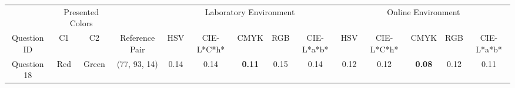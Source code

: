 \begin{table}[!htbp]
  \centering
  \resizebox{0.8\textwidth}{!} {
  \begin{tabular}{@{}cccccclccccclcccc@{}}
    \toprule
                                     & \multicolumn{2}{c}{Presented Colors}                        & \multicolumn{2}{c}{}                                                                                                  & \multicolumn{6}{c}{Laboratory Environment}                                                                                                                                                                                                                                                                     & \multicolumn{6}{c}{Online Environment}                                                                                                                                                                                                                                                                         \\ \cmidrule(lr){2-3} \cmidrule(l){6-17}
    \multirow{-2}{*}{Question ID}    & C1                           & C2                           & \multicolumn{2}{c}{\multirow{-2}{*}{Reference Pair}}                                                                  & \multicolumn{2}{c}{HSV}                                    & CIE-L*C*h*                                                 & CMYK                                                       & RGB                                                        & CIE-L*a*b*                                                 & \multicolumn{2}{c}{HSV}                                    & CIE-L*C*h*                                                 & CMYK                                                       & RGB                                                        & CIE-L*a*b*                                                 \\ \midrule
    \multicolumn{1}{c|}{Question 18} & \multicolumn{1}{c|}{Red}     & \multicolumn{1}{c|}{Green}   & \multicolumn{2}{c||}{\cellcolor[HTML]{FFFF00}(77, 93, 14)}                                                             & \multicolumn{2}{c|}{0.14}                                  & \multicolumn{1}{c|}{0.14}                                  & \multicolumn{1}{c|}{\cellcolor[HTML]{32CB00}\textbf{0.11}} & \multicolumn{1}{c|}{0.15}                                  & \multicolumn{1}{c||}{0.14}                                  & \multicolumn{2}{c|}{\cellcolor[HTML]{FFFFFF}0.12}          & \multicolumn{1}{c|}{\cellcolor[HTML]{FFFFFF}0.12}          & \multicolumn{1}{c|}{\cellcolor[HTML]{32CB00}\textbf{0.08}} & \multicolumn{1}{c|}{\cellcolor[HTML]{FFFFFF}0.12}          & \multicolumn{1}{c|}{0.11}                                  \\ \midrule

\end{tabular}}
\end{table}
